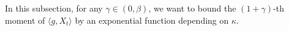 \documentclass[12pt, a4paper]{amsart}
\newtheorem{lem}[thm]{Lemma}
\theoremstyle{definition}
\numberwithin{equation}{section}
\begin{document}
 In this subsection, for any $\gamma \in (0,\beta)$, we want to bound the $(1+\gamma)$-th moment of $\langle g ,X_t \rangle $ by an exponential function depending on $\kappa$.
\begin{comment}
\begin{lem}\label{lem: lemma23}
For any $0< \gamma < \beta$ there exists a constant $C_2>0$ such that
$$\|M_k^t[g]\|_{1+\gamma}\leq C_2 e^{\frac{\alpha}{1+\gamma}t}e^{\frac{\gamma \alpha-\kappa(g)(1+\gamma)b}{1+\gamma}k},$$
for any $k \in \{0,...,t \}$.
\end{lem}
\begin{proof}
    Let $C(k)=e^{(\alpha-\kappa(g)b)k}$.
    Define events $A:=\{|M_t^k[g]|>C(k)\}$ and $A_{k,\mu}:=\{|\langle T_k^{\alpha}g, X_1\rangle-\langle T_{k+1}^{\alpha}g,\mu\rangle|>C(k)\}$ for each $k \in \mathbb N$ and $\mu \in \mathcal M(\mathbb R^d)$ with compact support.
    Notice that
\[
    \mathbb{P}_{\mu}[|M_k^t[g]|^{1+\gamma}]
    =\mathbb{P}_{\mu}[|M_k^t[g]\mathbf{1}_{A^c}|^{1+\gamma}]+\mathbb{P}_{\mu}[|M_k^t[g]\mathbf{1}_{A}|^{1+\gamma}]
    =:I+II.
\]
    For the first part,
\begin{align*}
    I\leq C(k)^{1+\gamma}
    =e^{(\alpha-\kappa(g)b)k(1+\gamma)}
    \leq e^{\alpha t}e^{(\gamma \alpha-\kappa(g)(1+\gamma)b)k},
\end{align*}
    since $k\leq t$.


\end{comment}
\end{document}
